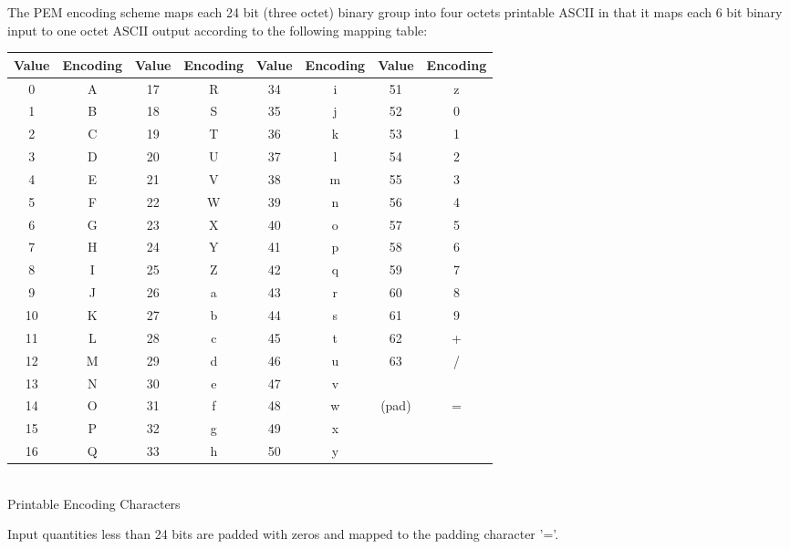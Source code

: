 
\newpage
The PEM encoding scheme maps each 24 bit (three octet) binary group into four octets
printable ASCII in that it maps each 6 bit binary input to one octet ASCII output
according to the following mapping table:
\begin{center}
\begin{tabular} {|cc|cc|cc|cc|} \hline
Value & Encoding & Value & Encoding & Value & Encoding & Value & Encoding \\ \hline
 0 & A & 17 & R & 34 & i & 51 & z \\
 1 & B & 18 & S & 35 & j & 52 & 0 \\
 2 & C & 19 & T & 36 & k & 53 & 1 \\
 3 & D & 20 & U & 37 & l & 54 & 2 \\
 4 & E & 21 & V & 38 & m & 55 & 3 \\
 5 & F & 22 & W & 39 & n & 56 & 4 \\
 6 & G & 23 & X & 40 & o & 57 & 5 \\
 7 & H & 24 & Y & 41 & p & 58 & 6 \\
 8 & I & 25 & Z & 42 & q & 59 & 7 \\
 9 & J & 26 & a & 43 & r & 60 & 8 \\
10 & K & 27 & b & 44 & s & 61 & 9 \\
11 & L & 28 & c & 45 & t & 62 & + \\
12 & M & 29 & d & 46 & u & 63 & / \\
13 & N & 30 & e & 47 & v &    &   \\
14 & O & 31 & f & 48 & w & (pad) & = \\
15 & P & 32 & g & 49 & x &    &   \\
16 & Q & 33 & h & 50 & y &    &   \\ \hline
\end{tabular}
\\ [1em]
Printable Encoding Characters \\
\end{center}
Input quantities less than 24 bits are padded with zeros and mapped
to the padding character '='. \\ [1em]

